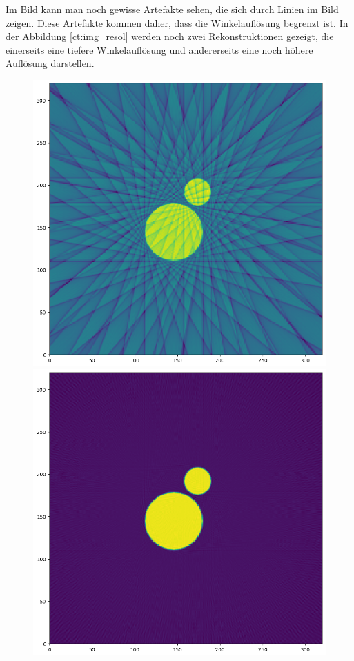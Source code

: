 Im Bild kann man noch gewisse Artefakte sehen, die sich durch Linien im Bild zeigen. Diese Artefakte kommen daher, dass die Winkelauflösung begrenzt ist. In der Abbildung \ref{ct:img_resol} werden noch zwei Rekonstruktionen gezeigt, die einerseits eine tiefere Winkelauflösung und andererseits eine noch höhere Auflösung darstellen.

\begin{figure}
	\centering
	\begin{minipage}{0.45\linewidth}
		\includegraphics[width=\linewidth]{papers/ct/images/fbp_low.png}
	\end{minipage}
	\begin{minipage}{0.45\linewidth}
		\includegraphics[width=\linewidth]{papers/ct/images/fbp_high.png}

\end{minipage}
\end{figure}
